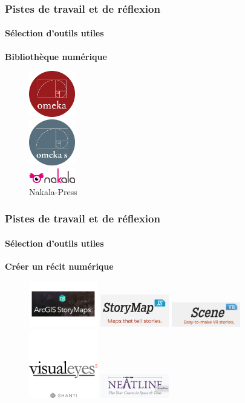\documentclass[xcolor=table]{beamer}
\begin{document}
\begin{frame}[plain]
\frametitle{Pistes de travail et de r\'eflexion}
\framesubtitle{S\'election d'outils utiles}
\textbf{Biblioth\`eque num\'erique}
\begin{figure}[!]
\includegraphics[width=2cm]{images/omeka-logo.png} \\
\includegraphics[width=2cm]{images/omeka-s-logo.png}\\
\includegraphics[width=2cm]{images/nakala-logo.png}\\
Nakala-Press
\end{figure}
\end{frame}

\begin{frame}[plain]
\frametitle{Pistes de travail et de r\'eflexion}
\framesubtitle{S\'election d'outils utiles}
\textbf{Cr\'eer un r\'ecit num\'erique}
\begin{figure}[!]
\includegraphics[width=3cm]{images/arcgis-storymaps-logo.png}
\includegraphics[width=3cm]{images/storymap-logo.png}
\includegraphics[width=3cm]{images/scene-logo.png}
\includegraphics[width=3cm]{images/visualeyes-logo.png}
\includegraphics[width=3cm]{images/neatline-plugin-logo.png}
\end{figure}
\end{frame}
\end{document}
